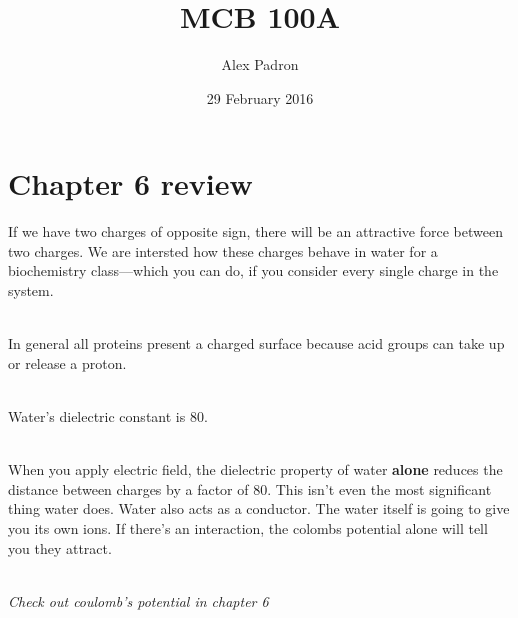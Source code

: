 \documentclass{article}
\title{MCB 100A}
\author{Alex Padron}
\date{29 February 2016}
\begin{document}
\maketitle

\section{Chapter 6 review}

If we have two charges of opposite sign, there will be an attractive force between two charges. We are intersted how these charges behave in water for a biochemistry class––which you can do, if you consider every single charge in the system.

\mbox{ }\\
In general all proteins present a charged surface because acid groups can take up or release a proton.

\mbox{ }\\
Water's dielectric constant is 80\epsilon.  

\mbox{}\\
When you apply electric field, the dielectric property of water \textbf{alone} reduces the distance between charges by a factor of 80. This isn't even the most significant thing water does. Water also acts as a conductor. The water itself is going to give you its own ions. If there's an interaction, the colombs potential alone will tell you they attract.

\mbox{}\\
\textit{Check out coulomb's potential in chapter 6}
\end{document}
